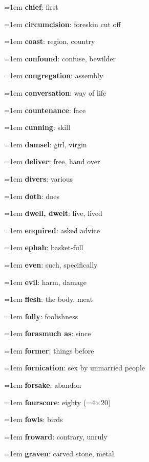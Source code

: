 {\begin{multicols}{3}
{\hangindent=1em \textbf{chief}: first\par
\hangindent=1em \textbf{circumcision}: foreskin cut off\par
\hangindent=1em \textbf{coast}: region, country\par
\hangindent=1em \textbf{confound}: confuse, bewilder\par
\hangindent=1em \textbf{congregation}: assembly\par
\hangindent=1em \textbf{conversation}: way of life\par
\hangindent=1em \textbf{countenance}: face\par
\hangindent=1em \textbf{cunning}: skill\par
\hangindent=1em \textbf{damsel}: girl, virgin\par
\hangindent=1em \textbf{deliver}: free, hand over\par
\hangindent=1em \textbf{divers}: various\par
\hangindent=1em \textbf{doth}: does\par
\hangindent=1em \textbf{dwell, dwelt}: live, lived\par
\hangindent=1em \textbf{enquired}: asked advice\par
\hangindent=1em \textbf{ephah}: basket-full\par
\hangindent=1em \textbf{even}: such, specifically\par
\hangindent=1em \textbf{evil}: harm, damage\par
\hangindent=1em \textbf{flesh}: the body, meat\par
\hangindent=1em \textbf{folly}: foolishness\par
\hangindent=1em \textbf{forasmuch as}: since\par
\hangindent=1em \textbf{former}: things before\par
\hangindent=1em \textbf{fornication}: sex by unmarried people\par
\hangindent=1em \textbf{forsake}: abandon\par
\hangindent=1em \textbf{fourscore}: eighty (=4$\times$20)\par
\hangindent=1em \textbf{fowls}: birds\par
\hangindent=1em \textbf{froward}: contrary, unruly\par
\hangindent=1em \textbf{graven}: carved stone, metal\par
}
\end{multicols}}
